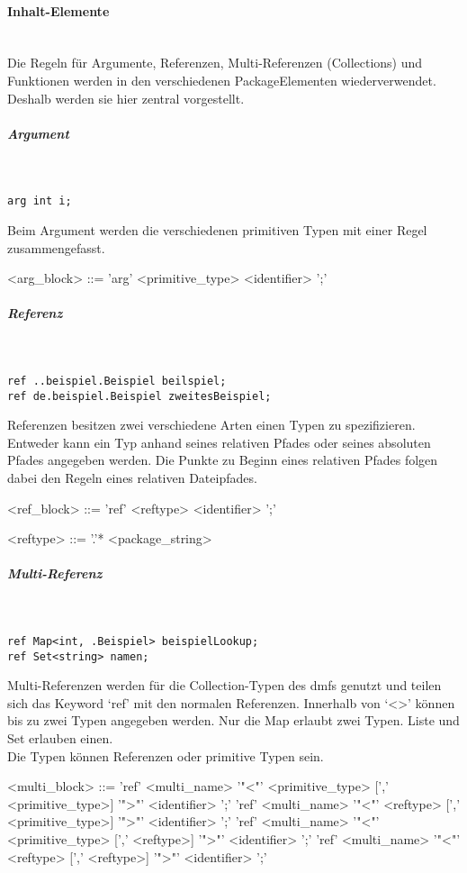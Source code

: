 \documentclass[./einleitung.tex]{subfiles}
\begin{document}
\paragraph{Inhalt-Elemente}\mbox{}\\
Die Regeln für Argumente, Referenzen, Multi-Referenzen (Collections) und Funktionen werden in den verschiedenen PackageElementen wiederverwendet.
Deshalb werden sie hier zentral vorgestellt.

\subparagraph{Argument}\mbox{}\\
\begin{lstlisting}
arg int i;
\end{lstlisting}
Beim Argument werden die verschiedenen primitiven Typen mit einer Regel zusammengefasst.
\begin{grammar}
<arg_block> ::= 'arg' <primitive_type> <identifier> ';'
\end{grammar}

\subparagraph{Referenz}\mbox{}\\
\begin{lstlisting}
ref ..beispiel.Beispiel beilspiel;
ref de.beispiel.Beispiel zweitesBeispiel;
\end{lstlisting}
Referenzen besitzen zwei verschiedene Arten einen Typen zu spezifizieren. \\
Entweder kann ein Typ anhand seines relativen Pfades oder seines absoluten Pfades angegeben werden.
Die Punkte zu Beginn eines relativen Pfades folgen dabei den Regeln eines relativen Dateipfades.
\begin{grammar}
<ref_block> ::= 'ref' <reftype> <identifier> ';'

<reftype> ::= '.'* <package_string>
\end{grammar}

\subparagraph{Multi-Referenz}\mbox{}\\
\begin{lstlisting}
ref Map<int, .Beispiel> beispielLookup;
ref Set<string> namen;
\end{lstlisting}
Multi-Referenzen werden für die Collection-Typen des \acrshort{dmf}s genutzt und teilen sich das Keyword `ref' mit den normalen Referenzen.
Innerhalb von `<>' können bis zu zwei Typen angegeben werden.
Nur die Map erlaubt zwei Typen.
Liste und Set erlauben einen. \\
Die Typen können Referenzen oder primitive Typen sein.
\begin{grammar}
<multi_block> ::= 'ref' <multi_name> '"<"' <primitive_type> [',' <primitive_type>] '">"' <identifier> ';'
\alt 'ref' <multi_name> '"<"' <reftype> [',' <primitive_type>] '">"' <identifier> ';'
\alt 'ref' <multi_name> '"<"' <primitive_type> [',' <reftype>] '">"' <identifier> ';'
\alt 'ref' <multi_name> '"<"' <reftype> [',' <reftype>] '">"' <identifier> ';'
\end{grammar}
\end{document}
